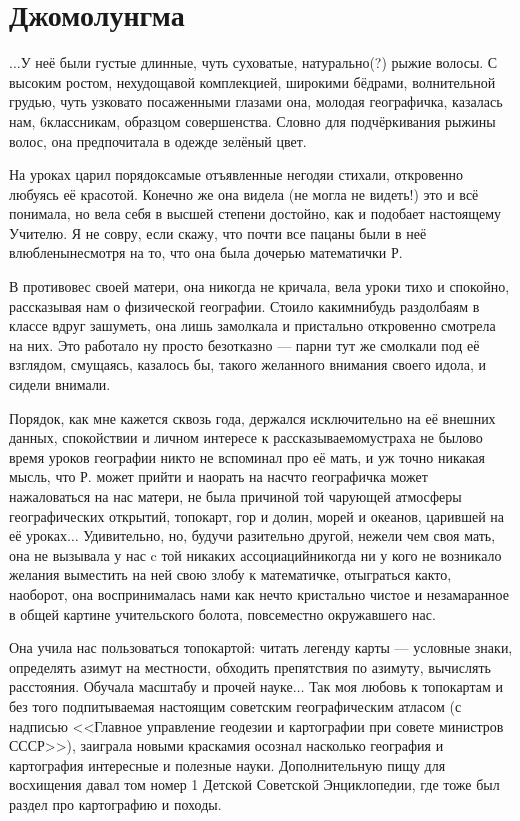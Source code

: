 \newpage
\section*{Джомолунгма}

$\ldots$У неё были густые длинные, чуть суховатые, натурально(?) рыжие волосы. С высоким ростом, нехудощавой комплекцией, широкими бёдрами, волнительной грудью, чуть узковато посаженными глазами она, молодая географичка, казалась нам, 6\sdash классникам, образцом совершенства. Словно для подчёркивания рыжины волос, она предпочитала в одежде зелёный цвет. 

На уроках царил порядок\mdash самые отъявленные негодяи стихали, откровенно любуясь её красотой. Конечно же она видела (не могла не видеть!) это и всё понимала, но вела себя в высшей степени достойно, как и подобает настоящему Учителю. Я не совру, если скажу, что почти все пацаны были в неё влюблены\mdash несмотря на то, что она была дочерью математички Р.

В противовес своей матери, она никогда не кричала, вела уроки тихо и спокойно, рассказывая нам о физической географии. Стоило каким\sdash нибудь раздолбаям в классе вдруг зашуметь, она лишь замолкала и пристально откровенно смотрела на них. Это работало ну просто безотказно — парни тут же смолкали под её взглядом, смущаясь, казалось бы, такого желанного внимания своего идола, и сидели внимали. 

Порядок, как мне кажется сквозь года, держался исключительно на её внешних данных, спокойствии и личном интересе к рассказываемому\mdash страха не было\mdash во время уроков географии никто не вспоминал про её мать, и уж точно никакая мысль, что Р. может прийти и наорать на нас\mdash что географичка может нажаловаться на нас матери, не была причиной той чарующей атмосферы географических открытий, топокарт, гор и долин, морей и океанов, царившей на её уроках$\ldots$ Удивительно, но, будучи разительно другой, нежели чем своя мать, она не вызывала у нас c той никаких ассоциаций\mdash никогда ни у кого не возникало желания выместить на ней свою злобу к математичке, отыграться как\sdash то, наоборот, она воспринималась нами как нечто кристально чистое и незамаранное в общей картине учительского болота, повсеместно окружавшего нас.
 
Она учила нас пользоваться топокартой: читать легенду карты — условные знаки, определять азимут на местности, обходить препятствия по азимуту, вычислять расстояния. Обучала масштабу и прочей науке$\ldots$ Так моя любовь к топокартам и без того подпитываемая настоящим советским географическим атласом (с надписью <<Главное управление геодезии и картографии при совете министров СССР>>), заиграла новыми красками\mdash я осознал насколько география и картография интересные и полезные науки. Дополнительную пищу для восхищения давал том номер 1 Детской Советской Энциклопедии, где тоже был раздел про картографию и походы. 

